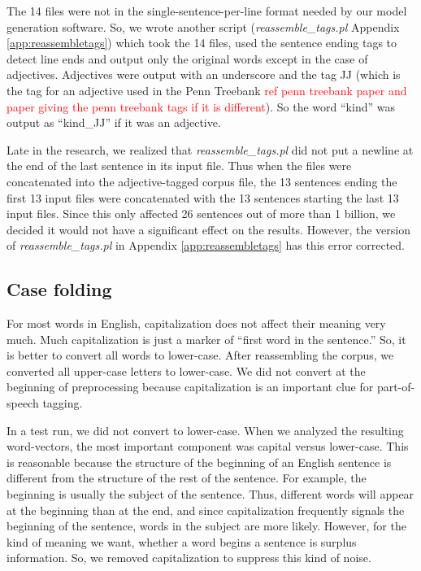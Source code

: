 \documentclass[10pt,letterpaper]{book}
\newcommand{\todo}[1]{\textcolor{red}{#1}}
\newcommand{\filename}[1]{\textit{#1}}
\begin{document}
The 14 files were not in the single-sentence-per-line format needed by our model generation software. So, we wrote another script (\filename{reassemble\_tags.pl} Appendix \ref{app:reassembletags}) which took the 14 files, used the sentence ending tags to detect line ends and output only the original words except in the case of adjectives. Adjectives were output with an underscore and the tag JJ (which is the tag for an adjective used in the Penn Treebank \todo{ref penn treebank paper and paper giving the penn treebank tags if it is different}). So the word ``kind'' was output as ``kind\_JJ'' if it was an adjective.

Late in the research, we realized that \filename{reassemble\_tags.pl} did not put a newline at the end of the last sentence in its input file. Thus when the files were concatenated into the adjective-tagged corpus file, the 13 sentences ending the first 13 input files were concatenated with the 13 sentences starting the last 13 input files. Since this only affected 26 sentences out of more than 1 billion, we decided it would not have a significant effect on the results. However, the version of \filename{reassemble\_tags.pl} in Appendix \ref{app:reassembletags} has this error corrected.

\subsection{Case folding}

For most words in English, capitalization does not affect their meaning very much. Much capitalization is just a marker of ``first word in the sentence.'' So, it is better to convert all words to lower-case. After reassembling the corpus, we converted all upper-case letters to lower-case. We did not convert at the beginning of preprocessing because capitalization is an important clue for part-of-speech tagging.

In a test run, we did not convert to lower-case. When we analyzed the resulting word-vectors, the most important component was capital versus lower-case. This is reasonable because the structure of the beginning of an English sentence is different from the structure of the rest of the sentence. For example, the beginning is usually the subject of the sentence. Thus, different words will appear at the beginning than at the end, and since capitalization frequently signals the beginning of the sentence, words in the subject are more likely. However, for the kind of meaning we want, whether a word begins a sentence is surplus information. So, we removed capitalization to suppress this kind of noise.
\end{document}
